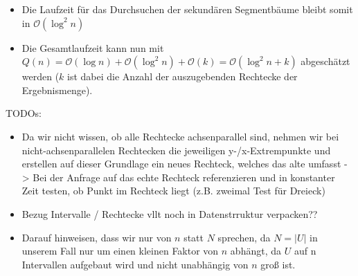 \documentclass[a4paper]{article}
\begin{document}
\begin{itemize}
	\item Die Laufzeit für das Durchsuchen der sekundären Segmentbäume bleibt somit in 
	 $\mathcal{O}(\log^2 n)$
	
\item Die Gesamtlaufzeit kann nun mit $Q(n) = \mathcal{O}(\log n) + \mathcal{O}(\log^2 n) + \mathcal{O}(k)
= \mathcal{O}(\log^2 n + k)$ abgeschätzt werden ($k$ ist dabei die Anzahl der auszugebenden Rechtecke
der Ergebnismenge).
\end{itemize}





TODOs:
\begin{itemize}
	\item Da wir nicht wissen, ob alle Rechtecke achsenparallel sind, nehmen wir bei nicht-achsenparallelen Rechtecken die jeweiligen y-/x-Extrempunkte und erstellen auf dieser Grundlage
	ein neues Rechteck, welches das alte umfasst -> Bei der Anfrage auf das echte Rechteck
	referenzieren und in konstanter Zeit testen, ob Punkt im Rechteck liegt (z.B. zweimal 
	Test für Dreieck)
	\item Bezug Intervalle / Rechtecke vllt noch in Datenstrruktur verpacken??
	\item Darauf hinweisen, dass wir nur von $n$ statt $N$ sprechen, da $N = |U|$ in unserem
	Fall nur um einen kleinen Faktor von $n$ abhängt, da $U$ auf n Intervallen aufgebaut wird 
	und nicht unabhängig von $n$ groß ist. 
\end{itemize}
\end{document}

